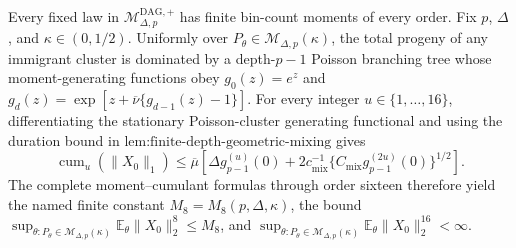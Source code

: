 Every fixed law in \(\mathcal M_{\Delta,p}^{\mathrm{DAG},+}\) has finite bin-count moments of every order. Fix \(p\), \(\Delta\), and \(\kappa\in(0,1/2)\). Uniformly over \(P_{\theta}\in\mathcal M_{\Delta,p}(\kappa)\), the total progeny of any immigrant cluster is dominated by a depth-\(p-1\) Poisson branching tree whose moment-generating functions obey \(g_0(z)=e^z\) and \(g_d(z)=\exp[z+\overline\nu\{g_{d-1}(z)-1\}]\). For every integer \(u\in\{1,\ldots,16\}\), differentiating the stationary Poisson-cluster generating functional and using the duration bound in \(\text{lem:finite-depth-geometric-mixing}\) gives \[\operatorname{cum}_u(\lVert X_0\rVert_1)\leq\overline\mu\left[\Delta g_{p-1}^{(u)}(0)+2c_{\mathrm{mix}}^{-1}\{C_{\mathrm{mix}}g_{p-1}^{(2u)}(0)\}^{1/2}\right].\] The complete moment--cumulant formulas through order sixteen therefore yield the named finite constant \(M_8=M_8(p,\Delta,\kappa)\), the bound \(\sup_{\theta:P_{\theta}\in\mathcal M_{\Delta,p}(\kappa)}\mathbb E_{\theta}\lVert X_0\rVert_2^8\leq M_8\), and \(\sup_{\theta:P_{\theta}\in\mathcal M_{\Delta,p}(\kappa)}\mathbb E_{\theta}\lVert X_0\rVert_2^{16}<\infty\).